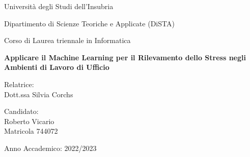 \pagestyle{empty}

\begin{center}
    
    
    \vspace*{\fill}
    
    \Large

    Università degli Studi dell'Insubria
    
    Dipartimento di Scienze Teoriche e Applicate (DiSTA)

    Corso di Laurea triennale in Informatica
    
    \vspace*{\fill}
    
    \LARGE
    
    \textbf{Applicare il Machine Learning per il Rilevamento dello Stress negli Ambienti di Lavoro di Ufficio}
    
    \vspace*{\fill}
    
    \Large
    
    \begin{multicols}{2}
        \begin{flushleft}
            Relatrice: \\
            Dott.ssa Silvia Corchs
        \end{flushleft}
        
        \columnbreak
    
        \begin{flushright}
            Candidato: \\
            Roberto Vicario \\
            Matricola 744072
        \end{flushright}
    \end{multicols}
    
    \vspace*{\fill}
    
    Anno Accademico: 2022/2023
\end{center}